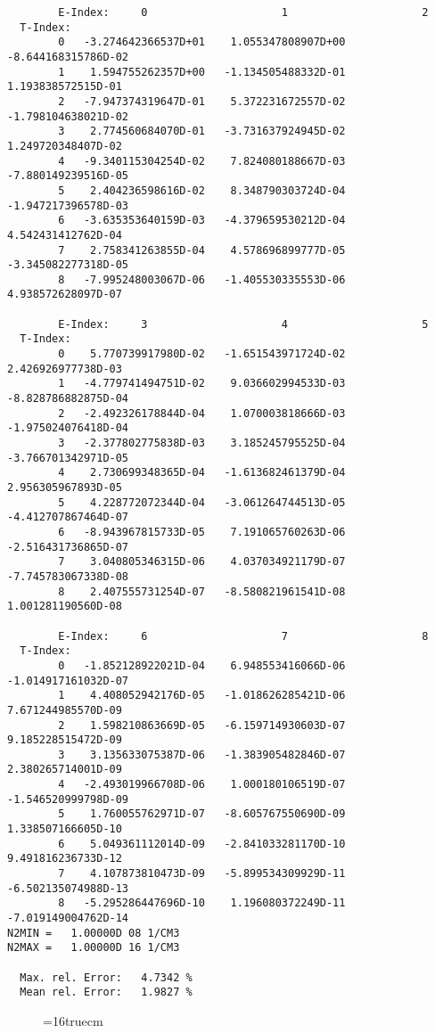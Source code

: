 \documentclass[12pt,dvipdfmx]{article}
\begin{document}
\begin{small}\begin{verbatim}
        E-Index:     0                     1                     2
  T-Index:
        0   -3.274642366537D+01    1.055347808907D+00   -8.644168315786D-02
        1    1.594755262357D+00   -1.134505488332D-01    1.193838572515D-01
        2   -7.947374319647D-01    5.372231672557D-02   -1.798104638021D-02
        3    2.774560684070D-01   -3.731637924945D-02    1.249720348407D-02
        4   -9.340115304254D-02    7.824080188667D-03   -7.880149239516D-05
        5    2.404236598616D-02    8.348790303724D-04   -1.947217396578D-03
        6   -3.635353640159D-03   -4.379659530212D-04    4.542431412762D-04
        7    2.758341263855D-04    4.578696899777D-05   -3.345082277318D-05
        8   -7.995248003067D-06   -1.405530335553D-06    4.938572628097D-07

        E-Index:     3                     4                     5
  T-Index:
        0    5.770739917980D-02   -1.651543971724D-02    2.426926977738D-03
        1   -4.779741494751D-02    9.036602994533D-03   -8.828786882875D-04
        2   -2.492326178844D-04    1.070003818666D-03   -1.975024076418D-04
        3   -2.377802775838D-03    3.185245795525D-04   -3.766701342971D-05
        4    2.730699348365D-04   -1.613682461379D-04    2.956305967893D-05
        5    4.228772072344D-04   -3.061264744513D-05   -4.412707867464D-07
        6   -8.943967815733D-05    7.191065760263D-06   -2.516431736865D-07
        7    3.040805346315D-06    4.037034921179D-07   -7.745783067338D-08
        8    2.407555731254D-07   -8.580821961541D-08    1.001281190560D-08

        E-Index:     6                     7                     8
  T-Index:
        0   -1.852128922021D-04    6.948553416066D-06   -1.014917161032D-07
        1    4.408052942176D-05   -1.018626285421D-06    7.671244985570D-09
        2    1.598210863669D-05   -6.159714930603D-07    9.185228515472D-09
        3    3.135633075387D-06   -1.383905482846D-07    2.380265714001D-09
        4   -2.493019966708D-06    1.000180106519D-07   -1.546520999798D-09
        5    1.760055762971D-07   -8.605767550690D-09    1.338507166605D-10
        6    5.049361112014D-09   -2.841033281170D-10    9.491816236733D-12
        7    4.107873810473D-09   -5.899534309929D-11   -6.502135074988D-13
        8   -5.295286447696D-10    1.196080372249D-11   -7.019149004762D-14
N2MIN =   1.00000D 08 1/CM3
N2MAX =   1.00000D 16 1/CM3

  Max. rel. Error:   4.7342 %
  Mean rel. Error:   1.9827 %
\end{verbatim}\end{small}
\begin{figure} \label{7.2.3b}
\epsfxsize=16truecm
\end{figure}
\newpage
\end{document}
